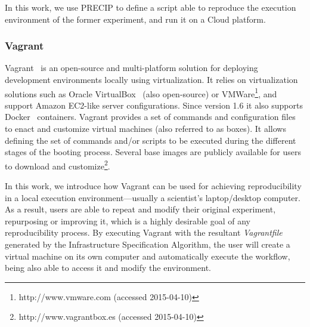 In this work, we use PRECIP to define a script able to reproduce the execution environment of the 
former experiment, and run it on a Cloud platform.


\subsubsection{Vagrant}

Vagrant~\cite{palat2012introducing} is an open-source and multi-platform solution for deploying 
development environments locally using virtualization. It relies on virtualization solutions such as 
Oracle VirtualBox~\cite{Watson2008} (also open-source) or  VMWare\footnote{http://www.vmware.com (accessed 2015-04-10)}, and support 
Amazon EC2-like server configurations. Since version 1.6 it also supports Docker~\cite{Merkel2014} 
containers.
Vagrant provides a set of commands and configuration files to enact and customize virtual machines
(also referred to as boxes). It allows defining the set of commands and/or scripts to be executed during 
the different stages of the booting process. Several base images are publicly available for users to 
download and customize\footnote{http://www.vagrantbox.es (accessed 2015-04-10)}. 
 
In this work, we introduce how Vagrant can be used for achieving reproducibility in a local execution
environment---usually a scientist's laptop/desktop computer. As a result, users are able to repeat and 
modify their original experiment, repurposing or improving it, which is a highly desirable goal of any 
reproducibility process. By executing Vagrant with the resultant {\it Vagrantfile} generated by the Infrastructure Specification Algorithm, 
the user will create a virtual machine on its own computer and automatically execute the workflow, 
being also able to access it and modify the environment.




